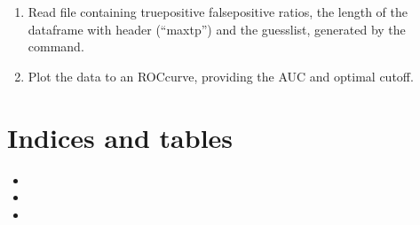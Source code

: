 \documentclass[letterpaper,10pt,english]{sphinxmanual}
\begin{document}

\begin{fulllineitems}
\label{\detokenize{mkloanpy:ronataswestoldturkiccommands.plot_eval.run}}
\pysigstartsignatures
{}
\pysigstopsignatures\begin{enumerate}
%
\item {} 
\sphinxAtStartPar
Read file  containing true\sphinxhyphen{}positive
false\sphinxhyphen{}positive ratios, the length of the dataframe with header
(“maxtp”) and the guesslist, generated by the  command.

\item {} 
\sphinxAtStartPar
Plot the data to an ROC\sphinxhyphen{}curve, providing the AUC and optimal cut\sphinxhyphen{}off.

\end{enumerate}

\end{fulllineitems}



\chapter{Indices and tables}
\label{\detokenize{index:indices-and-tables}}\begin{itemize}
\item {} 
\sphinxAtStartPar
{}

\item {} 
\sphinxAtStartPar
{}

\item {} 
\sphinxAtStartPar
{}

\end{itemize}
\end{document}
